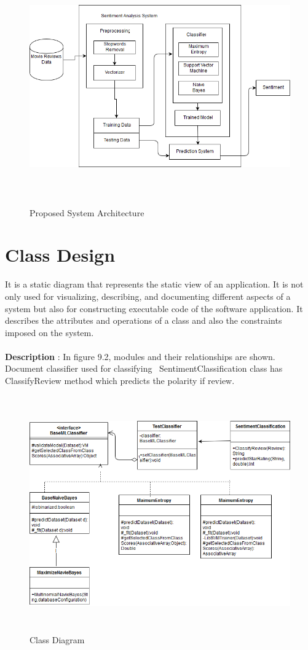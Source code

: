 \documentclass[oneside,a4paper,12pt]{pictreport}
\begin{document}
\begin{figure}[!h]
\includegraphics[width=5.7in,height=4.0in]{archi.png}
\caption{Proposed System Architecture}
\end{figure}

\section{Class Design}
It is a static diagram that represents the static view of an application. It is not only used for visualizing, describing, and documenting different aspects of a system but also for constructing executable code of the software application. It describes the attributes and operations of a class and also the constraints imposed on the system.\\\\
\textbf{Description} : In figure 9.2, modules and their relationships are shown. Document classifier used for classifying \
SentimentClassification class has ClassifyReview method which predicts the polarity if review.

\begin{figure}[h!]
\includegraphics[width=4.5in,height=4.0in]{class.png}
\caption{Class Diagram}
\end{figure}
\newpage
\end{document}
